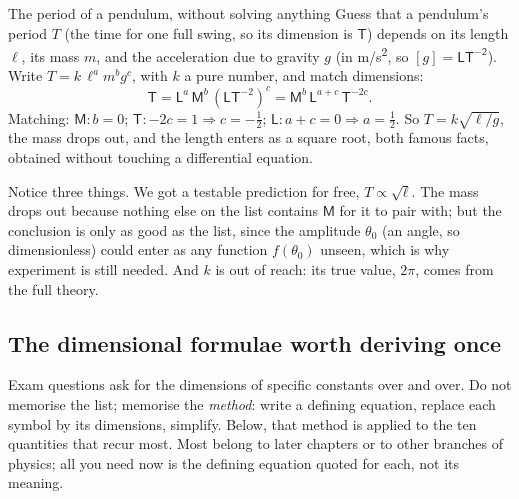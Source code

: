\begin{exbox}{The period of a pendulum, without solving anything}
Guess that a pendulum's period $T$ (the time for one full swing, so its dimension is $\mathsf{T}$)
depends on its length $\ell$, its mass $m$, and the acceleration due to gravity $g$ (in \si{m/s^2}, so
$[g]=\mathsf{LT^{-2}}$). Write $T=k\,\ell^a m^b g^c$, with $k$ a pure number, and match dimensions:
\[
\mathsf{T}=\mathsf{L}^a\,\mathsf{M}^b\,(\mathsf{L}\mathsf{T}^{-2})^c
=\mathsf{M}^b\,\mathsf{L}^{a+c}\,\mathsf{T}^{-2c}.
\]
Matching: $\mathsf{M}: b=0$; $\mathsf{T}: -2c=1\Rightarrow c=-\tfrac12$; $\mathsf{L}: a+c=0\Rightarrow
a=\tfrac12$. So $T=k\sqrt{\ell/g}$, the mass drops out, and the length enters as a square root, both
famous facts, obtained without touching a differential equation. 

\smallskip
Notice three things. We got a testable prediction for free, $T\propto\sqrt\ell$. The mass drops out
because nothing else on the list contains $\mathsf{M}$ for it to pair with; but the conclusion is only as
good as the list, since the amplitude $\theta_0$ (an angle, so dimensionless) could enter as any function
$f(\theta_0)$ unseen, which is why experiment is still needed. And $k$ is out of reach: its true value,
$2\pi$, comes from the full theory.
\end{exbox}

\subsection{The dimensional formulae worth deriving once}\label{sec:dimformulae}

Exam questions ask for the dimensions of specific constants over and over. Do not memorise the list;
memorise the \emph{method}: write a defining equation, replace each symbol by its dimensions, simplify.
Below, that method is applied to the ten quantities that recur most. Most belong to later chapters or
to other branches of physics; all you need now is the defining equation quoted for each, not its
meaning.

